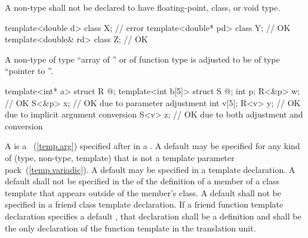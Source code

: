 \pnum
A non-type
shall not be declared to have floating-point, class, or void type.
\begin{example}

\begin{codeblock}
template<double d> class X;     // error
template<double* pd> class Y;   // OK
template<double& rd> class Z;   // OK
\end{codeblock}
\end{example}

\pnum
A non-type
%
of type ``array of '' or
%
of function type 
is adjusted to be of type ``pointer to ''.
\begin{example}

\begin{codeblock}
template<int* a>   struct R { @\commentellip@ };
template<int b[5]> struct S { @\commentellip@ };
int p;
R<&p> w;                        // OK
S<&p> x;                        // OK due to parameter adjustment
int v[5];
R<v> y;                         // OK due to implicit argument conversion
S<v> z;                         // OK due to both adjustment and conversion
\end{codeblock}
\end{example}

\pnum
A
is a
~(\ref{temp.arg}) specified after
\tcode{=}
in a
.
A default
may be specified for any kind of
(type, non-type, template)
that is not a template parameter pack~(\ref{temp.variadic}).
A default
may be specified in a template declaration.
A default
shall not be specified in the
of the definition of a member of a class template that appears outside
of the member's class.
A default
shall not be specified in a friend class template declaration.
If a friend function template declaration
specifies a default
,
that declaration shall be a definition and shall be the only declaration of
the function template in the translation unit.

